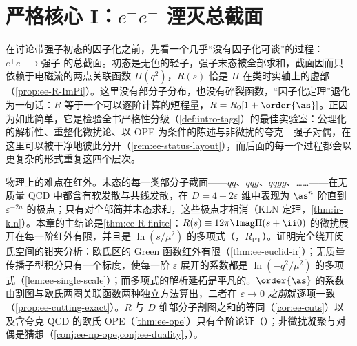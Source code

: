 \chapter{严格核心 I：$e^+e^-$ 湮灭总截面}\label{ch:ee}

在讨论带强子初态的因子化之前，先看一个几乎“没有因子化可谈”的过程：$e^+e^-\to\text{强子}$ 的总截面。初态是无色的轻子，强子末态被全部求和，截面因而只依赖于电磁流的两点关联函数 $\Pi(q^2)$，$R(s)$ 恰是 $\Pi$ 在类时实轴上的虚部（\cref{prop:ee-R-ImPi}）。这里没有部分子分布，也没有碎裂函数，“因子化定理”退化为一句话：$R$ 等于一个可以逐阶计算的短程量，$R=R_0[1+\order{\as}]$。正因为如此简单，它是检验全书严格性分级（\cref{def:intro-tags}）的最佳实验室：公理化的解析性、重整化微扰论、以 OPE 为条件的陈述与非微扰的夸克—强子对偶，在这里可以被干净地彼此分开（\cref{rem:ee-status-layout}），而后面的每一个过程都会以更复杂的形式重复这四个层次。

物理上的难点在红外。末态的每一类部分子截面——$q\bar q$、$q\bar qg$、$q\bar qgg$、……——在无质量 QCD 中都含有软发散与共线发散，在 $D=4-2\varepsilon$ 维中表现为 $\as^n$ 阶直到 $\varepsilon^{-2n}$ 的极点；只有对全部简并末态求和，这些极点才相消（KLN 定理，\cref{thm:ir-kln}）。本章的主结论是\cref{thm:ee-R-finite}：$R(s)\equiv12\pi\Imag\Pi(s+\ii0)$ 的微扰展开在每一阶红外有限，并且是 $\ln(s/\mu^2)$ 的多项式（\tagR，$R_{\mathrm{PT}}$）。证明完全绕开闵氏空间的钳夹分析：欧氏区的 Green 函数红外有限（\cref{thm:ee-euclid-ir}）；无质量传播子型积分只有一个标度，使每一阶 $\varepsilon$ 展开的系数都是 $\ln(-q^2/\mu^2)$ 的多项式（\cref{lem:ee-single-scale}）；而多项式的解析延拓是平凡的。$\order{\as}$ 的系数由割图与欧氏两圈关联函数两种独立方法算出，二者在 $\varepsilon\to0$ \emph{之前}就逐项一致（\cref{prop:ee-cutting-exact}）。$R$ 与 $D$ 维部分子割图之和的等同（\cref{cor:ee-cuts}）以及含夸克 QCD 的欧氏 OPE（\cref{thm:ee-ope}）只有全阶论证（\tagA）；非微扰凝聚与对偶是猜想（\cref{conj:ee-np-ope,conj:ee-duality}，\tagC）。

